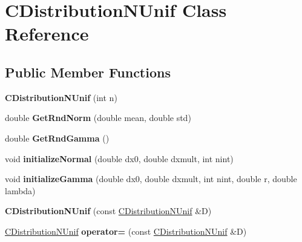\hypertarget{class_c_distribution_n_unif}{}\section{C\+Distribution\+N\+Unif Class Reference}
\label{class_c_distribution_n_unif}
\subsection*{Public Member Functions}
\begin{DoxyCompactItemize}
\item 
\mbox{\label{class_c_distribution_n_unif_a322da5392eaf8dbbe4d70516385665f0}} 
{\bfseries C\+Distribution\+N\+Unif} (int n)
\item 
\mbox{\label{class_c_distribution_n_unif_a431fd4d845f8258035dec9d9438e20ec}} 
double {\bfseries Get\+Rnd\+Norm} (double mean, double std)
\item 
\mbox{\label{class_c_distribution_n_unif_a0f3270cc00b62e247aff0526c552cb66}} 
double {\bfseries Get\+Rnd\+Gamma} ()
\item 
\mbox{\label{class_c_distribution_n_unif_a6b303fd8adac94e4c82c54c3f02c4b44}} 
void {\bfseries initialize\+Normal} (double dx0, double dxmult, int nint)
\item 
\mbox{\label{class_c_distribution_n_unif_a80bf70f0ed1f9e3dd206b17f593eacd7}} 
void {\bfseries initialize\+Gamma} (double dx0, double dxmult, int nint, double r, double lambda)
\item 
\mbox{\label{class_c_distribution_n_unif_aa96bf296ea37a8905b329bbcc88496f4}} 
{\bfseries C\+Distribution\+N\+Unif} (const \hyperlink{class_c_distribution_n_unif}{C\+Distribution\+N\+Unif} \&D)
\item 
\mbox{\label{class_c_distribution_n_unif_a89d3a493bb3dc1b2473221a62b409c1f}} 
\hyperlink{class_c_distribution_n_unif}{C\+Distribution\+N\+Unif} {\bfseries operator=} (const \hyperlink{class_c_distribution_n_unif}{C\+Distribution\+N\+Unif} \&D)
\end{DoxyCompactItemize}
